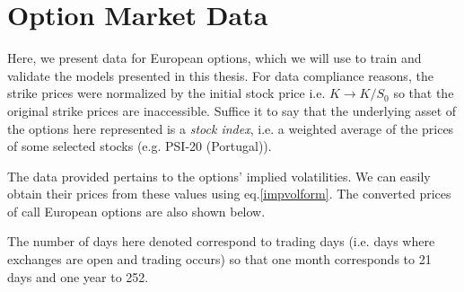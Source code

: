
\chapter{Option Market Data}
\label{chapter:mktdata}

Here, we present data for European options, which we will use to train and validate the models presented in this thesis. For data compliance reasons, the strike prices were normalized by the initial stock price i.e. $K\rightarrow K/S_0$ so that the original strike prices are inaccessible.
Suffice it to say that the underlying asset of the options here represented is a \emph{stock index}, i.e. a weighted average of the prices of some selected stocks (e.g. PSI-20 (Portugal)).

The data provided pertains to the options' implied volatilities. We can easily obtain their prices from these values using eq.\eqref{impvolform}. The converted prices of call European options are also shown below.

The number of days here denoted correspond to trading days (i.e. days where exchanges are open and trading occurs) so that one month corresponds to 21 days and one year to 252.

